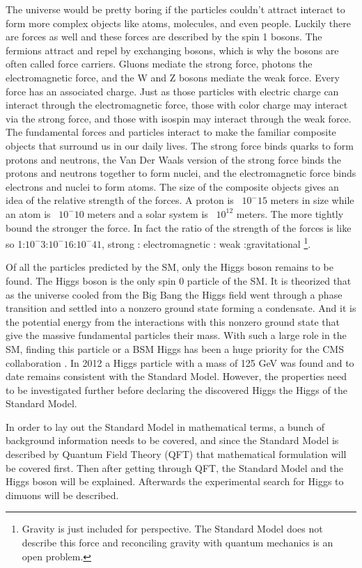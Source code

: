 The universe would be pretty boring if the particles couldn't attract interact to form more complex objects like atoms, molecules, and even people. Luckily there are forces as well and these forces are described by the spin 1 bosons. The fermions attract and repel by exchanging bosons, which is why the bosons are often called force carriers. Gluons mediate the strong force, photons the electromagnetic force, and the W and Z bosons mediate the weak force. Every force has an associated charge. Just as those particles with electric charge can interact through the electromagnetic force, those with color charge may interact via the strong force, and those with isospin may interact through the weak force. The fundamental forces and particles interact to make the familiar composite objects that surround us in our daily lives. The strong force binds quarks to form protons and neutrons, the Van Der Waals version of the strong force binds the protons and neutrons together to form nuclei, and the electromagnetic force binds electrons and nuclei to form atoms. The size of the composite objects gives an idea of the relative strength of the forces. A proton is ~$10^-15$ meters in size while an atom is ~$10^-10$ meters and a solar system is ~$10^12$ meters. The more tightly bound the stronger the force. In fact the ratio of the strength of the forces is like so 1:$10^-3$:$10^-16$:$10^-41$, strong : electromagnetic : weak :gravitational \footnote{Gravity is just included for perspective. The Standard Model does not describe this force and reconciling gravity with quantum mechanics is an open problem.}. 

Of all the particles predicted by the SM, only the Higgs boson remains to be found. The Higgs boson is the only spin 0 particle of the SM. It is theorized that as the universe cooled from the Big Bang the Higgs field went through a phase transition and settled into a nonzero ground state forming a condensate. And it is the potential energy from the interactions with this nonzero ground state that give the massive fundamental particles their mass. With such a large role in the SM, finding this particle or a BSM Higgs has been a huge priority for the CMS collaboration \cite{tdr}. In 2012 a Higgs particle with a mass of 125 GeV was found and to date remains consistent with the Standard Model. However, the properties need to be investigated further before declaring the discovered Higgs the Higgs of the Standard Model. 

In order to lay out the Standard Model in mathematical terms, a bunch of background information needs to be covered, and since the Standard Model is described by Quantum Field Theory (QFT) that mathematical formulation will be covered first. Then after getting through QFT, the Standard Model and the Higgs boson will be explained. Afterwards the experimental search for Higgs to dimuons will be described.

